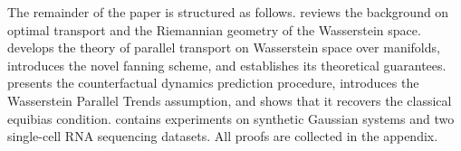 \documentclass[11pt]{article}
\begin{document}
The remainder of the paper is structured as follows.  reviews the background on optimal transport and the Riemannian geometry of the Wasserstein space.  develops the theory of parallel transport on Wasserstein space over manifolds, introduces the novel fanning scheme, and establishes its theoretical guarantees.  presents the counterfactual dynamics prediction procedure, introduces the Wasserstein Parallel Trends assumption, and shows that it recovers the classical equibias condition.  contains experiments on synthetic Gaussian systems and two single-cell RNA sequencing datasets. All proofs are collected in the appendix.

\end{document}
